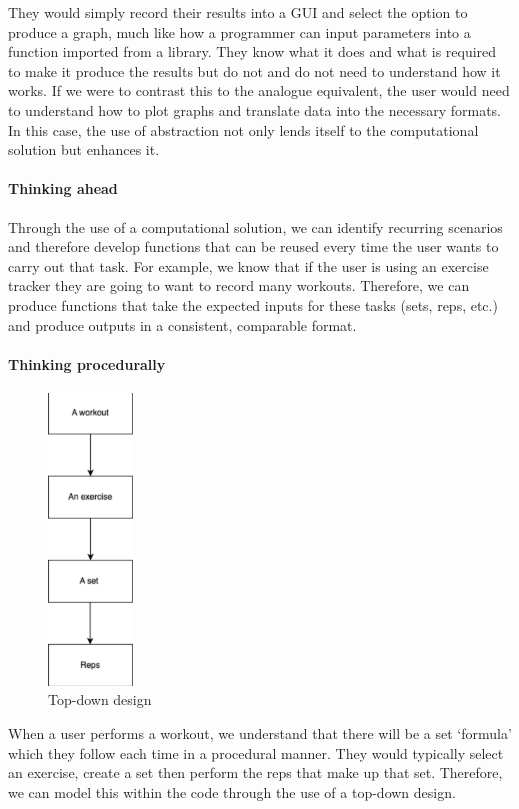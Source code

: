 \documentclass{article}
\begin{document}
They would simply record their results into a GUI and select the option to produce a graph, much like how a programmer can input parameters into a function imported from a library. They know what it does and what is required to make it produce the results but do not and do not need to understand how it works. If we were to contrast this to the analogue equivalent, the user would need to understand how to plot graphs and translate data into the necessary formats. In this case, the use of abstraction not only lends itself to the computational solution but enhances it.
\paragraph{Thinking ahead}
Through the use of a computational solution, we can identify recurring scenarios and therefore develop functions that can be reused every time the user wants to carry out that task. For example, we know that if the user is using an exercise tracker they are going to want to record many workouts. Therefore, we can produce functions that take the expected inputs for these tasks (sets, reps, etc.) and produce outputs in a consistent, comparable format.
\newpage
\paragraph{Thinking procedurally}
\begin{figure} %
  \includegraphics[width=0.2\textwidth]{Figure 2.png}
  \caption{Top-down design}
\end{figure}
When a user performs a workout, we understand that there will be a set ‘formula’ which they follow each time in a procedural manner. They would typically select an exercise, create a set then perform the reps that make up that set. Therefore, we can model this within the code through the use of a top-down design. 
\end{document}
